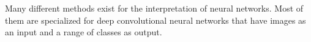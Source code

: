 Many different methods exist for the interpretation of neural networks. Most of them are specialized for deep convolutional neural networks that have images as an input and a range of classes as output.